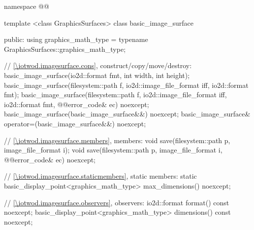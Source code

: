\begin{codeblock}
namespace @\fullnamespace{}@ {
  template <class GraphicsSurfaces>
  class basic_image_surface {
  public:
    using graphics_math_type = typename GraphicsSurfaces::graphics_math_type;

    // \ref{\iotwod.imagesurface.cons}, construct/copy/move/destroy:
    basic_image_surface(io2d::format fmt, int width, int height);
    basic_image_surface(filesystem::path f, io2d::image_file_format iff, io2d::format fmt);
    basic_image_surface(filesystem::path f, io2d::image_file_format iff, io2d::format fmt,
      @\stdqualifier{}@error_code& ec) noexcept;
    basic_image_surface(basic_image_surface&&) noexcept;
    basic_image_surface& operator=(basic_image_surface&&) noexcept;

    // \ref{\iotwod.imagesurface.members}, members:
    void save(filesystem::path p, image_file_format i);
    void save(filesystem::path p, image_file_format i, @\stdqualifier{}@error_code& ec) noexcept;

    // \ref{\iotwod.imagesurface.staticmembers}, static members:
    static basic_display_point<graphics_math_type> max_dimensions() noexcept;

    // \ref{\iotwod.imagesurface.observers}, observers:
    io2d::format format() const noexcept;
    basic_display_point<graphics_math_type> dimensions() const noexcept;
	
}}
\end{codeblock}
